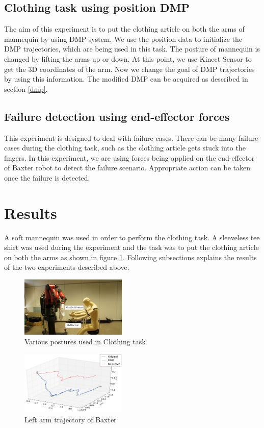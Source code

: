\documentclass[sigconf]{acmart}
\begin{document}
\subsection{Clothing task using position DMP}
The aim of this experiment is to put the clothing article on both the arms of mannequin by using DMP system. We use the position data to initialize the DMP trajectories, which are being used in this task. The posture of mannequin is changed by lifting the arms up or down. At this point, we use Kinect Sensor to get the 3D coordinates of the arm. Now we change the goal of DMP trajectories by using this information. The modified DMP can be acquired as described in section \ref{dmp}.

\subsection{Failure detection using end-effector forces}
This experiment is designed to deal with failure cases. There can be many failure cases during the clothing task, such as the clothing article gets stuck into the fingers. In this experiment, we are using forces being applied on the end-effector of Baxter robot to detect the failure scenario. Appropriate action can be taken once the failure is detected.

\section{Results}
\label{results}
A soft mannequin was used in order to perform the clothing task. A sleeveless tee shirt was used during the experiment and the task was to put the clothing article on both the arms as shown in figure \ref{various_posture}. Following subsections explains the results of the two experiments described above.

\begin{figure}
	\includegraphics[width=0.45\textwidth]{various_posture}
	\caption{Various postures used in Clothing task}
	\label{various_posture}
\end{figure}

\begin{figure}
	\includegraphics[width=0.45\textwidth]{trajectory}
	\caption{Left arm trajectory of Baxter}
	\label{trajectory}
\end{figure}
\end{document}
